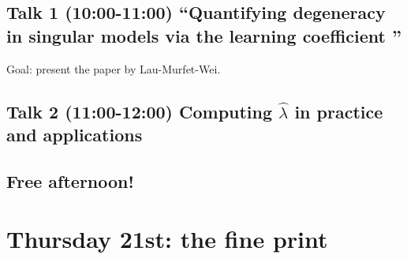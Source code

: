 \documentclass[a4paper,11pt]{amsart}
\newcommand{\lambdahat}{\widehat{\lambda}}
\begin{document}
\subsection*{Talk 1 (10:00-11:00) ``Quantifying degeneracy in singular models via the learning coefficient ''}

Goal: present the paper \cite{lambdahat} by Lau-Murfet-Wei.

\subsection*{Talk 2 (11:00-12:00) Computing $\lambdahat$ in practice and applications}

\subsection*{Free afternoon!}








\section*{Thursday 21st: the fine print}
\end{document}
